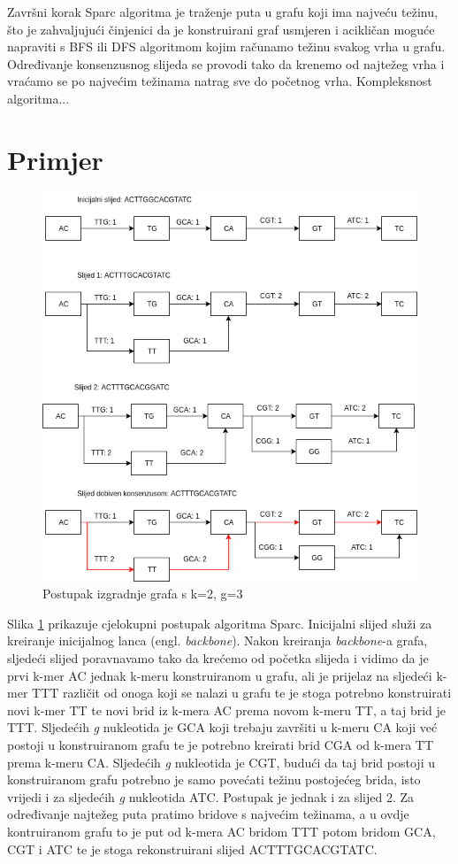 \documentclass[times, utf8, seminar, numeric]{fer}
\begin{document}
Završni korak Sparc algoritma je traženje puta u grafu koji ima najveću težinu, što je zahvaljujući činjenici da je konstruirani graf usmjeren i acikličan moguće napraviti s BFS ili DFS algoritmom kojim računamo težinu svakog vrha u grafu. Određivanje konsenzusnog slijeda se provodi tako da krenemo od najtežeg vrha i vraćamo se po najvećim težinama natrag sve do početnog vrha. Kompleksnost algoritma...

\section{Primjer}
\begin{figure}[htb]
	\centering
	\includegraphics[scale=0.6]{images/backbone.png}
	\caption{Postupak izgradnje grafa s k=2, g=3}
	\label{picture:example}
\end{figure}

Slika \ref{picture:example} prikazuje cjelokupni postupak algoritma Sparc. Inicijalni slijed služi za kreiranje inicijalnog lanca (engl. \emph{backbone}). Nakon kreiranja \emph{backbone}-a grafa, sljedeći slijed poravnavamo tako da krećemo od početka slijeda i vidimo da je prvi k-mer AC jednak k-meru konstruiranom u grafu, ali je prijelaz na sljedeći k-mer TTT različit od onoga koji se nalazi u grafu te je stoga potrebno konstruirati novi k-mer TT te novi brid iz k-mera AC prema novom k-meru TT, a taj brid je TTT. Sljedećih \emph{g} nukleotida je GCA koji trebaju završiti u k-meru CA koji već postoji u konstruiranom grafu te je potrebno kreirati brid CGA od k-mera TT prema k-meru CA. Sljedećih \emph{g} nukleotida je CGT, budući da taj brid postoji u konstruiranom grafu potrebno je samo povećati težinu postojećeg brida, isto vrijedi i za sljedećih \emph{g} nukleotida ATC. Postupak je jednak i za slijed 2. Za određivanje najtežeg puta pratimo bridove s najvećim težinama, a u ovdje kontruiranom grafu to je put od k-mera AC bridom TTT potom bridom GCA, CGT i ATC te je stoga rekonstruirani slijed ACTTTGCACGTATC.
\end{document}
